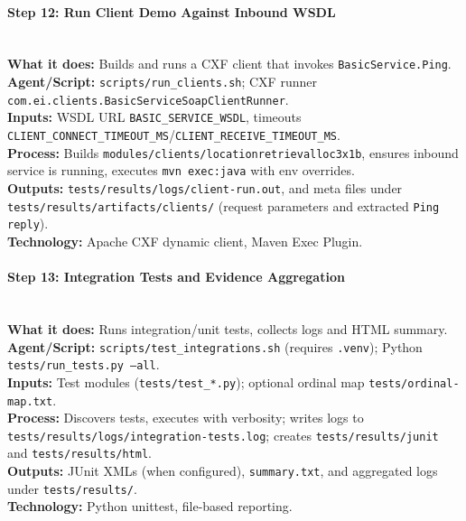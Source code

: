 \documentclass[11pt,a4paper]{article}
\begin{document}
\paragraph{Step 12: Run Client Demo Against Inbound WSDL} \hfill\\
\textbf{What it does:} Builds and runs a CXF client that invokes \texttt{BasicService.Ping}.\\
\textbf{Agent/Script:} \texttt{scripts/run\_clients.sh}; CXF runner \texttt{com.ei.clients.BasicServiceSoapClientRunner}.\\
\textbf{Inputs:} WSDL URL \texttt{BASIC\_SERVICE\_WSDL}, timeouts \texttt{CLIENT\_CONNECT\_TIMEOUT\_MS}/\texttt{CLIENT\_RECEIVE\_TIMEOUT\_MS}.\\
\textbf{Process:} Builds \texttt{modules/clients/locationretrievalloc3x1b}, ensures inbound service is running, executes \texttt{mvn exec:java} with env overrides.\\
\textbf{Outputs:} \texttt{tests/results/logs/client-run.out}, and meta files under \texttt{tests/results/artifacts/clients/} (request parameters and extracted \texttt{Ping reply}).\\
\textbf{Technology:} Apache CXF dynamic client, Maven Exec Plugin.

\paragraph{Step 13: Integration Tests and Evidence Aggregation} \hfill\\
\textbf{What it does:} Runs integration/unit tests, collects logs and HTML summary.\\
\textbf{Agent/Script:} \texttt{scripts/test\_integrations.sh} (requires \texttt{.venv}); Python \texttt{tests/run\_tests.py --all}.\\
\textbf{Inputs:} Test modules (\texttt{tests/test\_*.py}); optional ordinal map \texttt{tests/ordinal-map.txt}.\\
\textbf{Process:} Discovers tests, executes with verbosity; writes logs to \texttt{tests/results/logs/integration-tests.log}; creates \texttt{tests/results/junit} and \texttt{tests/results/html}.\\
\textbf{Outputs:} JUnit XMLs (when configured), \texttt{summary.txt}, and aggregated logs under \texttt{tests/results/}.\\
\textbf{Technology:} Python unittest, file-based reporting.
\end{document}
